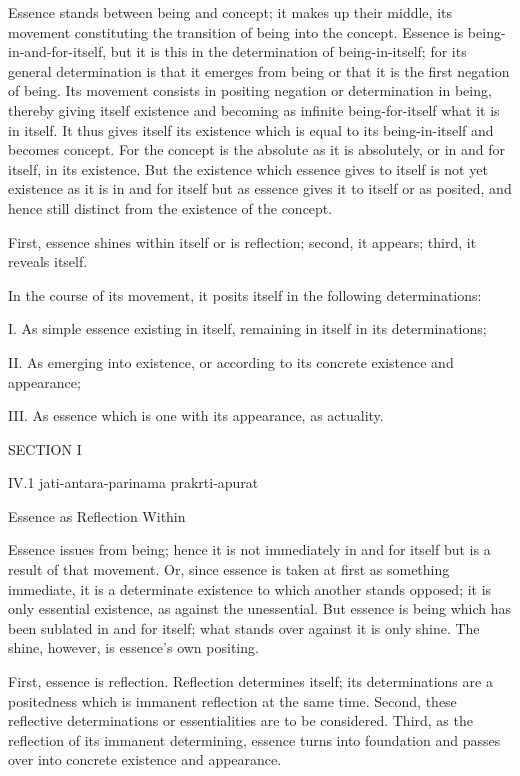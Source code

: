 Essence stands between being and concept;
it makes up their middle,
its movement constituting the transition
of being into the concept.
Essence is being-in-and-for-itself,
but it is this in the determination of being-in-itself;
for its general determination is that it emerges from being
or that it is the first negation of being.
Its movement consists in positing negation
or determination in being, thereby giving itself existence and becoming
as infinite being-for-itself what it is in itself.
It thus gives itself its existence
which is equal to its being-in-itself
and becomes concept.
For the concept is the absolute as it is absolutely,
or in and for itself, in its existence.
But the existence which essence gives to itself is
not yet existence as it is in and for itself
but as essence gives it to itself or as posited,
and hence still distinct from the existence of the concept.

First, essence shines within itself or is reflection;
second, it appears;
third, it reveals itself.

In the course of its movement, it posits itself in the following determinations:

I. As simple essence existing in itself,
remaining in itself in its determinations;

II. As emerging into existence,
or according to its concrete existence and appearance;

III. As essence which is one with its appearance,
as actuality.

SECTION I

IV.1
jati-antara-parinama prakrti-apurat

Essence as Reflection Within

Essence issues from being;
hence it is not immediately in and for itself
but is a result of that movement.
Or, since essence is taken at first as something immediate,
it is a determinate existence to which another stands opposed;
it is only essential existence, as against the unessential.
But essence is being which has been sublated in and for itself;
what stands over against it is only shine.
The shine, however, is essence's own positing.

First, essence is reflection.
Reflection determines itself;
its determinations are a positedness
which is immanent reflection at the same time.
Second, these reflective determinations
or essentialities are to be considered.
Third, as the reflection of its immanent determining,
essence turns into foundation and passes over
into concrete existence and appearance.

